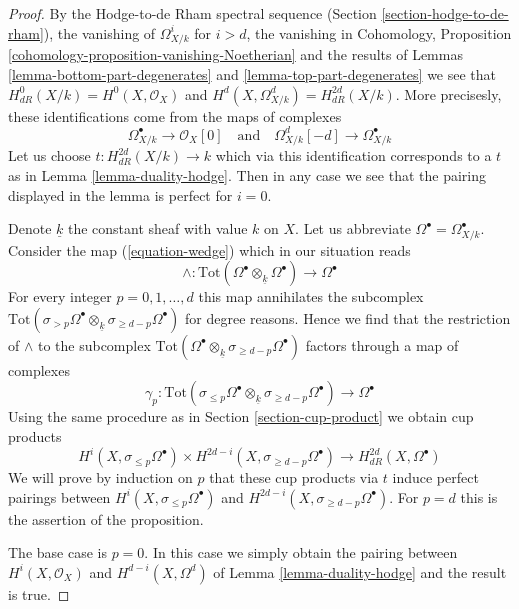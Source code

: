 \begin{proof}
By the Hodge-to-de Rham spectral sequence
(Section \ref{section-hodge-to-de-rham}), the vanishing
of $\Omega^i_{X/k}$ for $i > d$, the vanishing in
Cohomology, Proposition \ref{cohomology-proposition-vanishing-Noetherian}
and the results of Lemmas \ref{lemma-bottom-part-degenerates} and
\ref{lemma-top-part-degenerates}
we see that $H^0_{dR}(X/k) = H^0(X, \mathcal{O}_X)$
and $H^d(X, \Omega^d_{X/k}) = H_{dR}^{2d}(X/k)$.
More precisesly, these identifications come from the maps
of complexes
$$
\Omega^\bullet_{X/k} \to \mathcal{O}_X[0]
\quad\text{and}\quad
\Omega^d_{X/k}[-d] \to \Omega^\bullet_{X/k}
$$
Let us choose $t : H_{dR}^{2d}(X/k) \to k$ which via this identification
corresponds to a $t$ as in Lemma \ref{lemma-duality-hodge}.
Then in any case we see that the pairing displayed in the lemma
is perfect for $i = 0$.

\medskip\noindent
Denote $\underline{k}$ the constant sheaf with value $k$ on $X$.
Let us abbreviate $\Omega^\bullet = \Omega^\bullet_{X/k}$.
Consider the map (\ref{equation-wedge}) which in our situation reads
$$
\wedge :
\text{Tot}(\Omega^\bullet \otimes_{\underline{k}} \Omega^\bullet)
\longrightarrow
\Omega^\bullet
$$
For every integer $p = 0, 1, \ldots, d$ this map
annihilates the subcomplex
$\text{Tot}(\sigma_{> p} \Omega^\bullet \otimes_{\underline{k}}
\sigma_{\geq d - p} \Omega^\bullet)$ for degree reasons.
Hence we find that the restriction of $\wedge$ to the subcomplex
$\text{Tot}(\Omega^\bullet \otimes_{\underline{k}}
\sigma_{\geq d - p}\Omega^\bullet)$ factors through a map of complexes
$$
\gamma_p :
\text{Tot}(\sigma_{\leq p} \Omega^\bullet \otimes_{\underline{k}}
\sigma_{\geq d - p} \Omega^\bullet)
\longrightarrow
\Omega^\bullet
$$
Using the same procedure as in Section \ref{section-cup-product} we obtain
cup products
$$
H^i(X, \sigma_{\leq p} \Omega^\bullet) \times
H^{2d - i}(X, \sigma_{\geq d - p}\Omega^\bullet)
\longrightarrow
H_{dR}^{2d}(X, \Omega^\bullet)
$$
We will prove by induction on $p$ that these cup products via $t$
induce perfect pairings between $H^i(X, \sigma_{\leq p} \Omega^\bullet)$
and $H^{2d - i}(X, \sigma_{\geq d - p}\Omega^\bullet)$. For $p = d$
this is the assertion of the proposition.

\medskip\noindent
The base case is $p = 0$. In this case we simply obtain the pairing
between $H^i(X, \mathcal{O}_X)$ and $H^{d - i}(X, \Omega^d)$ of
Lemma \ref{lemma-duality-hodge} and the result is true.


\end{proof}
